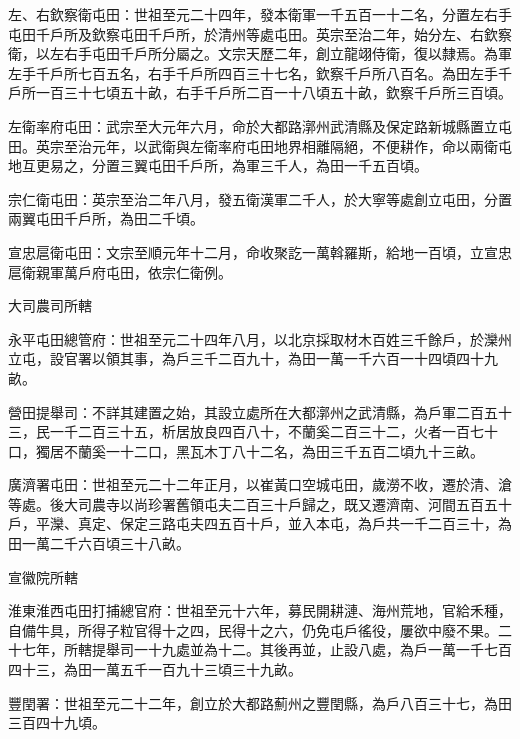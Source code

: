 \begin{pinyinscope}
 左、右欽察衛屯田：世祖至元二十四年，發本衛軍一千五百一十二名，分置左右手屯田千戶所及欽察屯田千戶所，於清州等處屯田。英宗至治二年，始分左、右欽察衛，以左右手屯田千戶所分屬之。文宗天歷二年，創立龍翊侍衛，復以隸焉。為軍左手千戶所七百五名，右手千戶所四百三十七名，欽察千戶所八百名。為田左手千戶所一百三十七頃五十畝，右手千戶所二百一十八頃五十畝，欽察千戶所三百頃。



 左衛率府屯田：武宗至大元年六月，命於大都路漷州武清縣及保定路新城縣置立屯田。英宗至治元年，以武衛與左衛率府屯田地界相離隔絕，不便耕作，命以兩衛屯地互更易之，分置三翼屯田千戶所，為軍三千人，為田一千五百頃。



 宗仁衛屯田：英宗至治二年八月，發五衛漢軍二千人，於大寧等處創立屯田，分置兩翼屯田千戶所，為田二千頃。



 宣忠扈衛屯田：文宗至順元年十二月，命收聚訖一萬斡羅斯，給地一百頃，立宣忠扈衛親軍萬戶府屯田，依宗仁衛例。



 大司農司所轄



 永平屯田總管府：世祖至元二十四年八月，以北京採取材木百姓三千餘戶，於灤州立屯，設官署以領其事，為戶三千二百九十，為田一萬一千六百一十四頃四十九畝。



 營田提舉司：不詳其建置之始，其設立處所在大都漷州之武清縣，為戶軍二百五十三，民一千二百三十五，析居放良四百八十，不蘭奚二百三十二，火者一百七十口，獨居不蘭奚一十二口，黑瓦木丁八十二名，為田三千五百二頃九十三畝。



 廣濟署屯田：世祖至元二十二年正月，以崔黃口空城屯田，歲澇不收，遷於清、滄等處。後大司農寺以尚珍署舊領屯夫二百三十戶歸之，既又遷濟南、河間五百五十戶，平灤、真定、保定三路屯夫四五百十戶，並入本屯，為戶共一千二百三十，為田一萬二千六百頃三十八畝。



 宣徽院所轄



 淮東淮西屯田打捕總官府：世祖至元十六年，募民開耕漣、海州荒地，官給禾種，自備牛具，所得子粒官得十之四，民得十之六，仍免屯戶徭役，屢欲中廢不果。二十七年，所轄提舉司一十九處並為十二。其後再並，止設八處，為戶一萬一千七百四十三，為田一萬五千一百九十三頃三十九畝。



 豐閏署：世祖至元二十二年，創立於大都路薊州之豐閏縣，為戶八百三十七，為田三百四十九頃。




\end{pinyinscope}
